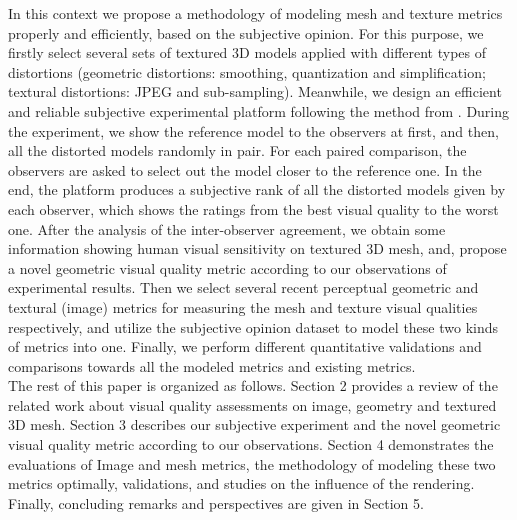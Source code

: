 In this context we propose a methodology of modeling mesh and texture metrics properly and efficiently, based on the subjective opinion. For this purpose, we firstly select several sets of textured 3D models applied with different types of distortions (geometric distortions: smoothing, quantization and simplification; textural distortions: JPEG and sub-sampling). Meanwhile, we design an efficient and reliable subjective experimental platform following the method from \cite{Farrell_2001}. During the experiment, we show the reference model to the observers at first, and then, all the distorted models randomly in pair. For each paired comparison, the observers are asked to select out the model closer to the reference one. In the end, the platform produces a subjective rank of all the distorted models given by each observer, which shows the ratings from the best visual quality to the worst one. After the analysis of the inter-observer agreement, we obtain some information showing human visual sensitivity on textured 3D mesh, and, propose a novel geometric visual quality metric according to our observations of experimental results. Then we select several recent perceptual geometric and textural (image) metrics for measuring the mesh and texture visual qualities respectively, and utilize the subjective opinion dataset to model these two kinds of metrics into one. Finally, we perform different quantitative validations and comparisons towards all the modeled metrics and existing metrics.\\
The rest of this paper is organized as follows. Section 2 provides a review of the related work about visual quality assessments on image, geometry and textured 3D mesh.  Section 3 describes our subjective experiment and the novel geometric visual quality metric according to our observations.
Section 4 demonstrates the evaluations of Image and mesh metrics, the methodology of  modeling these two  metrics optimally, validations, and studies on the influence of the rendering. Finally, concluding remarks and perspectives are given in Section 5.